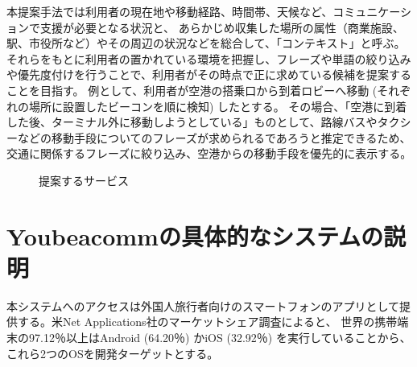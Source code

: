 \documentclass[openany,11pt,papersize]{jsbook}
\begin{document}
本提案手法では利用者の現在地や移動経路、時間帯、天候など、コミュニケーションで支援が必要となる状況と、
あらかじめ収集した場所の属性（商業施設、駅、市役所など）やその周辺の状況などを総合して、「コンテキスト」と呼ぶ。
それらをもとに利用者の置かれている環境を把握し、フレーズや単語の絞り込みや優先度付けを行うことで、利用者がその時点で正に求めている候補を提案することを目指す。
例として、利用者が空港の搭乗口から到着ロビーへ移動 (それぞれの場所に設置したビーコンを順に検知) したとする。
その場合、「空港に到着した後、ターミナル外に移動しようとしている」ものとして、路線バスやタクシーなどの移動手段についてのフレーズが求められるであろうと推定できるため、
交通に関係するフレーズに絞り込み、空港からの移動手段を優先的に表示する。
\begin{figure}[htbp]
 \begin{center}
 \end{center}
 \caption{提案するサービス}
 \label{fig:use_flow}
\end{figure}

\section{Youbeacommの具体的なシステムの説明}\label{sec:yonnoni}
 本システムへのアクセスは外国人旅行者向けのスマートフォンのアプリとして提供する。米Net Applications社のマーケットシェア調査\cite{b}によると、
世界の携帯端末の97.12％以上はAndroid (64.20％) かiOS (32.92％) を実行していることから、これら2つのOSを開発ターゲットとする。
\end{document}
